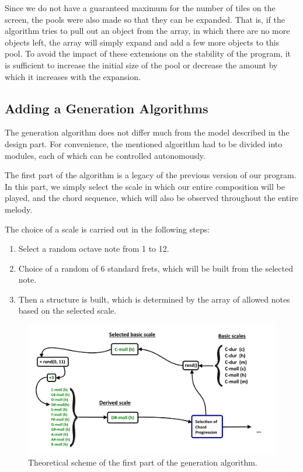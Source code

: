 \documentclass[thesis=B,english]{FITthesis}[2019/12/23]
\begin{document}
Since we do not have a guaranteed maximum for the number of tiles on the screen, the pools were also made so that they can be expanded. That is, if the algorithm tries to pull out an object from the array, in which there are no more objects left, the array will simply expand and add a few more objects to this pool. To avoid the impact of these extensions on the stability of the program, it is sufficient to increase the initial size of the pool or decrease the amount by which it increases with the expansion.

\subsection{Adding a Generation Algorithms}

The generation algorithm does not differ much from the model described in the design part. For convenience, the mentioned algorithm had to be divided into modules, each of which can be controlled autonomously.

The first part of the algorithm is a legacy of the previous version of our program. In this part, we simply select the scale in which our entire composition will be played, and the chord sequence, which will also be observed throughout the entire melody.

The choice of a scale is carried out in the following steps:
\begin{enumerate}
    \item Select a random octave note from 1 to 12.
    \item Choice of a random of 6 standard frets, which will be built from the selected note.
    \item Then a structure is built, which is determined by the array of allowed notes based on the selected scale.
\end{enumerate}

\begin{figure}[ht]
            \includegraphics[width=\textwidth]{Theory1.png}
            \caption{Theoretical scheme of the first part of the generation algorithm.}
            \label{fig:Theory1}
\end{figure}
\end{document}
